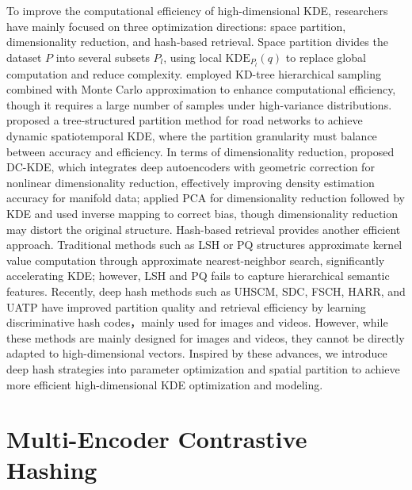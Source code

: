 \documentclass[conference]{IEEEtran}
\begin{document}
To improve the computational efficiency of high-dimensional KDE, researchers have mainly focused on three optimization directions: space partition, dimensionality reduction, and hash-based retrieval.
Space partition divides the dataset $P$ into several subsets $P_l$, using local $\mathrm{KDE}_{P_l}(q)$ to replace global computation and reduce complexity. \cite{reff6} employed KD-tree hierarchical sampling combined with Monte Carlo approximation to enhance computational efficiency, though it requires a large number of samples under high-variance distributions. \cite{reff8} proposed a tree-structured partition method for road networks to achieve dynamic spatiotemporal KDE, where the partition granularity must balance between accuracy and efficiency.
In terms of dimensionality reduction, \cite{reff9} proposed DC-KDE, which integrates deep autoencoders with geometric correction for nonlinear dimensionality reduction, effectively improving density estimation accuracy for manifold data; \cite{reff10} applied PCA for dimensionality reduction followed by KDE and used inverse mapping to correct bias, though dimensionality reduction may distort the original structure.
Hash-based retrieval provides another efficient approach. Traditional methods \cite{reff13,reff15,reff17} such as LSH or PQ structures approximate kernel value computation through approximate nearest-neighbor search, significantly accelerating KDE; however, LSH and PQ fails to capture hierarchical semantic features. Recently, deep hash methods such as UHSCM\cite{tu2023unsupervised}, SDC\cite{ng2023unsupervised}, FSCH\cite{cao2023unsupervised}, HARR\cite{ma2024harr}, and UATP\cite{tang2024once} have improved partition quality and retrieval efficiency by learning discriminative hash codes，mainly used for images and videos. However, while these methods are mainly designed for images and videos, they cannot be directly adapted to high-dimensional vectors. Inspired by these advances, we introduce deep hash strategies into parameter optimization and spatial partition to achieve more efficient high-dimensional KDE optimization and modeling.
\section{Multi-Encoder Contrastive Hashing}
\end{document}
